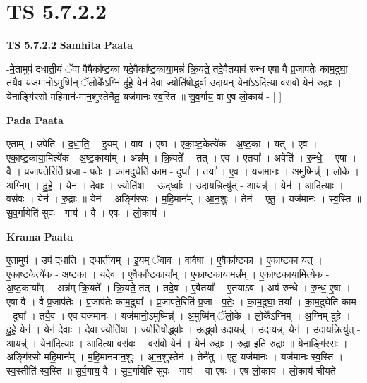 \documentclass[17pt]{extarticle}
\begin{document}
\section{ TS 5.7.2.2 }

\textbf{TS 5.7.2.2 } \newline
\textbf{Samhita Paata} \newline

-मे॒तामुप॑ दधाती॒यं ॅवा वैषैका᳚ष्ट॒का यदे॒वैका᳚ष्ट॒काया॒मन्नं॑ क्रि॒यते॒ तदे॒वैतयाव॑ रुन्ध ए॒षा वै प्र॒जाप॑तेः काम॒दुघा॒ तयै॒व यज॑मानो॒ऽमुष्मि॑न् ॅलो॒के᳚ऽग्निं दु॑हे॒ येन॑ दे॒वा ज्योति॑षो॒र्द्ध्वा उ॒दाय॒न्॒ येना॑ऽऽदि॒त्या वस॑वो॒ येन॑ रु॒द्राः । येनाङ्गि॑रसो महि॒मान॑-मान॒शुस्तेनै॑तु॒ यज॑मानः स्व॒स्ति ॥ सु॒व॒र्गाय॒ वा ए॒ष लो॒काय॑ - [  ] \newline

\textbf{Pada Paata} \newline

ए॒ताम् । उपेति॑ । द॒धा॒ति॒ । इ॒यम् । वाव । ए॒षा । ए॒का॒ष्ट॒केत्ये॑क - अ॒ष्ट॒का । यत् । ए॒व । ए॒का॒ष्ट॒काया॒मित्ये॑क - अ॒ष्ट॒काया᳚म् । अन्न᳚म् । क्रि॒यते᳚ । तत् । ए॒व । ए॒तया᳚ । अवेति॑ । रु॒न्धे॒ । ए॒षा । वै । प्र॒जाप॑ते॒रिति॑ प्र॒जा - प॒तेः॒ । का॒म॒दुघेति॑ काम - दुघा᳚ । तया᳚ । ए॒व । यज॑मानः । अ॒मुष्मिन्न्॑ । लो॒के । अ॒ग्निम् । दु॒हे॒ । येन॑ । दे॒वाः । ज्योति॑षा । ऊ॒द्‌र्ध्वाः । उ॒दाय॒न्नित्यु॑त् - आयन्न्॑ । येन॑ । आ॒दि॒त्याः । वस॑वः । येन॑ । रु॒द्राः ॥ येन॑ । अङ्गि॑रसः । म॒हि॒मान᳚म् । आ॒न॒शुः । तेन॑ । ए॒तु॒ । यज॑मानः । स्व॒स्ति ॥ सु॒व॒र्गायेति॑ सुवः - गाय॑ । वै । ए॒षः । लो॒काय॑ ।  \newline


\textbf{Krama Paata} \newline

ए॒तामुप॑ । उप॑ दधाति । द॒धा॒ती॒यम् । इ॒यम् ॅवाव । वावैषा । ए॒षैका᳚ष्ट॒का । ए॒का॒ष्ट॒का यत् । ए॒का॒ष्ट॒केत्ये॑क - अ॒ष्ट॒का । यदे॒व । ए॒वैका᳚ष्ट॒काया᳚म् । ए॒का॒ष्ट॒काया॒मन्न᳚म् । ए॒का॒ष्ट॒काया॒मित्ये॑क - अ॒ष्ट॒काया᳚म् । अन्न॑म् क्रि॒यते᳚ । क्रि॒यते॒ तत् । तदे॒व । ए॒वैतया᳚ । ए॒तयाऽव॑ । अव॑ रुन्धे । रु॒न्ध॒ ए॒षा । ए॒षा वै । वै प्र॒जाप॑तेः । प्र॒जाप॑तेः काम॒दुघा᳚ । प्र॒जाप॑ते॒रिति॑ प्र॒जा - प॒तेः॒ । का॒म॒दुघा॒ तया᳚ । का॒म॒दुघेति॑ काम - दुघा᳚ । तयै॒व । ए॒व यज॑मानः । यज॑मानो॒ऽमुष्मिन्न्॑ । अ॒मुष्मि॑न् ॅलो॒के । लो॒के᳚ऽग्निम् । अ॒ग्निम् दु॑हे । दु॒हे॒ येन॑ । येन॑ दे॒वाः । दे॒वा ज्योति॑षा । ज्योति॑षो॒र्द्ध्वाः । ऊ॒र्द्ध्वा उ॒दायन्न्॑ । उ॒दाय॒न्न्॒. येन॑ । उ॒दाय॒न्नित्यु॑त् - आयन्न्॑ । येना॑दि॒त्याः । आ॒दि॒त्या वस॑वः । वस॑वो॒ येन॑ । येन॑ रु॒द्राः । रु॒द्रा इति॑ रु॒द्राः ॥ येनाङ्गि॑रसः । अङ्गि॑रसो महि॒मान᳚म् । म॒हि॒मान॑मान॒शुः । आ॒न॒शुस्तेन॑ । तेनै॑तु । ए॒तु॒ यज॑मानः । यज॑मानः स्व॒स्ति । स्व॒स्तीति॑ स्व॒स्ति ॥ सु॒र्व॒गाय॒ वै । सु॒व॒र्गायेति॑ सुवः - गाय॑ । वा ए॒षः । ए॒ष लो॒काय॑ । लो॒काय॑ चीयते \newline
\end{document}
